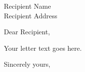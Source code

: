\documentclass[11pt]{iitletterProf}
\date{\today}
\begin{document}
\begin{letter}{Recipient Name\\Recipient Address}

\opening{Dear Recipient,}

Your letter text goes here.

\closing{Sincerely yours,}


\end{letter}
\end{document}
